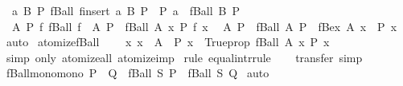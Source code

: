 \begin{isabellebody}
\ \ {\isachardoublequoteopen}{\isasymAnd}a\ B\ P{\isachardot}\ fBall\ {\isacharparenleft}finsert\ a\ B{\isacharparenright}\ P\ {\isacharequal}\ {\isacharparenleft}P\ a\ {\isasymand}\ fBall\ B\ P{\isacharparenright}{\isachardoublequoteclose}\isanewline
\ \ {\isachardoublequoteopen}{\isasymAnd}A\ P\ f{\isachardot}\ fBall\ {\isacharparenleft}f\ {\isacharbar}{\isacharbackquote}{\isacharbar}\ A{\isacharparenright}\ P\ {\isacharequal}\ fBall\ A\ {\isacharparenleft}{\isasymlambda}x{\isachardot}\ P\ {\isacharparenleft}f\ x{\isacharparenright}{\isacharparenright}{\isachardoublequoteclose}\isanewline
\ \ {\isachardoublequoteopen}{\isasymAnd}A\ P{\isachardot}\ {\isacharparenleft}{\isasymnot}\ fBall\ A\ P{\isacharparenright}\ {\isacharequal}\ fBex\ A\ {\isacharparenleft}{\isasymlambda}x{\isachardot}\ {\isasymnot}\ P\ x{\isacharparenright}{\isachardoublequoteclose}\isanewline
%
\isadelimproof
%
\endisadelimproof
%
\isatagproof
{}\isamarkupfalse%
\ auto%
\endisatagproof
{\isafoldproof}%
%
\isadelimproof
\isanewline
%
\endisadelimproof
\isanewline
{}\isamarkupfalse%
\ atomize{\isacharunderscore}fBall{\isacharcolon}\isanewline
\ \ \ \ {\isachardoublequoteopen}{\isacharparenleft}{\isasymAnd}x{\isachardot}\ x\ {\isacharbar}{\isasymin}{\isacharbar}\ A\ {\isacharequal}{\isacharequal}{\isachargreater}\ P\ x{\isacharparenright}\ {\isacharequal}{\isacharequal}\ Trueprop\ {\isacharparenleft}fBall\ A\ {\isacharparenleft}{\isasymlambda}x{\isachardot}\ P\ x{\isacharparenright}{\isacharparenright}{\isachardoublequoteclose}\isanewline
%
\isadelimproof
%
\endisadelimproof
%
\isatagproof
{}\isamarkupfalse%
\ {\isacharparenleft}simp\ only{\isacharcolon}\ atomize{\isacharunderscore}all\ atomize{\isacharunderscore}imp{\isacharparenright}\isanewline
{}\isamarkupfalse%
\ {\isacharparenleft}rule\ equal{\isacharunderscore}intr{\isacharunderscore}rule{\isacharparenright}\isanewline
\ \ \isamarkupfalse%
\ {\isacharparenleft}transfer{\isacharcomma}\ simp{\isacharparenright}{\isacharplus}%
\endisatagproof
{\isafoldproof}%
%
\isadelimproof
\isanewline
%
\endisadelimproof
\isanewline
{}\isamarkupfalse%
\ fBall{\isacharunderscore}mono{\isacharbrackleft}mono{\isacharbrackright}{\isacharcolon}\ {\isachardoublequoteopen}P\ {\isasymle}\ Q\ {\isasymLongrightarrow}\ fBall\ S\ P\ {\isasymle}\ fBall\ S\ Q{\isachardoublequoteclose}\isanewline
%
\isadelimproof
%
\endisadelimproof
%
\isatagproof
{}\isamarkupfalse%
\ auto%
\endisatagproof
{\isafoldproof}%
%
\isadelimproof
\isanewline
%
\endisadelimproof
\isanewline

\end{isabellebody}
